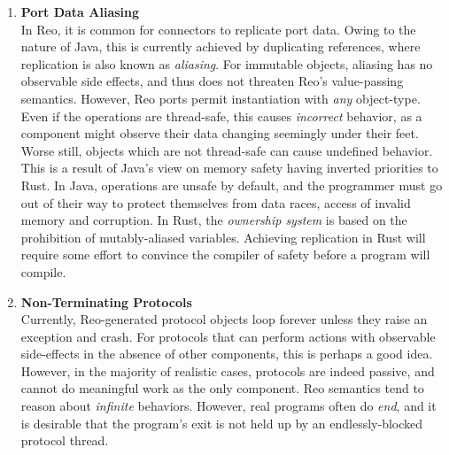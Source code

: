 \begin{enumerate}
	\item \textbf{Port Data Aliasing}\\
	In Reo, it is common for connectors to replicate port data. Owing to the nature of Java, this is currently achieved by duplicating references, where replication is also known as \textit{aliasing}. For immutable objects, aliasing has no observable side effects, and thus does not threaten Reo's value-passing semantics. However, Reo ports permit instantiation with \textit{any} object-type. Even if the operations are thread-safe, this causes \textit{incorrect} behavior, as a component might observe their data changing seemingly under their feet. Worse still, objects which are not thread-safe can cause undefined behavior. This is a result of Java's view on memory safety having inverted priorities to Rust. In Java, operations are unsafe by default, and the programmer must go out of their way to protect themselves from data races, access of invalid memory and corruption. In Rust, the \textit{ownership system} is based on the prohibition of mutably-aliased variables. Achieving replication in Rust will require some effort to convince the compiler of safety before a program will compile.
	
	\item \textbf{Non-Terminating Protocols}\\
	Currently, Reo-generated protocol objects loop forever unless they raise an exception and crash. For protocols that can perform actions with observable side-effects in the absence of other components, this is perhaps a good idea. However, in the majority of realistic cases, protocols are indeed passive, and cannot do meaningful work as the only component. Reo semantics tend to reason about \textit{infinite} behaviors. However, real programs often do \textit{end}, and it is desirable that the program's exit is not held up by an endlessly-blocked protocol thread.
	

\end{enumerate}
